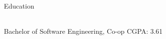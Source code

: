 \documentclass{resume} %
\begin{document}

\begin{rSection}{Education}

\vspace{-0.75em}
\\ Bachelor of Software Engineering, Co-op \hfill {CGPA: 3.61 } 

\end{rSection}
\end{document}
